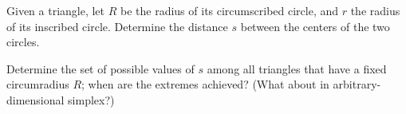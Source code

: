 Given a triangle,
let $R$ be the radius of its circumscribed circle,
and $r$ the radius of its inscribed circle.
Determine the distance $s$ between the centers of the two circles.

Determine the set of possible values of $s$
among all triangles that have a fixed circumradius $R$;
when are the extremes achieved?\newline
(What about in arbitrary-dimensional simplex?)
